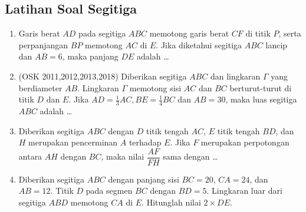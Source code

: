 \subsection{Latihan Soal Segitiga }
\begin{enumerate}    
    \item Garis berat $AD$ pada segitiga $ABC$ memotong garis berat $CF$ di titik $P$, serta perpanjangan $BP$ memotong $AC$ di $E$. Jika diketahui segitiga $ABC$ lancip dan $AB=6$, maka panjang $DE$ adalah \dots

    \item (OSK 2011,2012,2013,2018) Diberikan segitiga $ABC$ dan lingkaran $\Gamma$ yang berdiameter $AB$. Lingkaran $\Gamma$ memotong sisi $AC$ dan $BC$ berturut-turut di titik $D$ dan $E$. Jika $AD = \frac13 AC, BE =\frac14 BC$ dan $AB = 30$, maka luas segitiga $ABC$ adalah \dots
		
    \item Diberikan segitiga $ABC$ dengan $D$ titik tengah $AC$, $E$ titik tengah $BD$, dan $H$ merupakan pencerminan $A$ terhadap $E$. Jika $F$ merupakan perpotongan antara $AH$ dengan $BC$, maka nilai $\dfrac{AF}{FH}$ sama dengan \dots
		 
    \item Diberikan segitiga $ABC$ dengan panjang sisi $BC = 20$, $CA = 24$, dan $AB=12$. Titik $D$ pada segmen $BC$ dengan $BD = 5$. Lingkaran luar dari segitiga $ABD$ memotong $CA$ di $E$. Hitunglah nilai $2 \times DE$.
\end{enumerate}